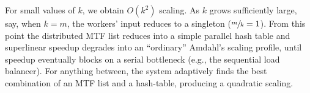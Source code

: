 For small values of $k$, we obtain $O(k^2)$ scaling. As $k$ grows sufficiently large, say, when $k=m$, the workers' input reduces to a singleton ($\sfrac{m}{k}=1$). From this point the distributed MTF list reduces into a simple parallel hash table and superlinear speedup degrades into an ``ordinary'' Amdahl's scaling profile, until speedup eventually blocks on a serial bottleneck (e.g., the sequential load balancer).  For anything between, the system adaptively finds the best combination of an MTF list and a hash-table, producing a quadratic scaling.


